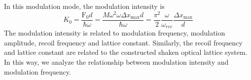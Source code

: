 \documentclass[
 reprint,
amsmath,amssymb,
aps,
pra,
floatfix,
]{revtex4-2}
\begin{document}

In this modulation mode, the modulation intensity is
\begin{equation}
  K_{0}=\frac{\mathrm{F}_{0} d}{\hbar \omega}=\frac{M \omega^{2} \omega \Delta x_{\max } d}{\hbar \omega}=\frac{\pi^{2}}{2} \frac{\omega}{\omega_{r e c}} \frac{\Delta x_{\max }}{d}
\end{equation}
The modulation intensity is related to modulation frequency, modulation amplitude, recoil frequency and lattice constant. 
Similarly, the recoil frequency and lattice constant are related to the constructed shaken optical lattice system. 
In this way, we analyze the relationship between modulation intensity and modulation frequency.












\nocite{*}

\end{document}
